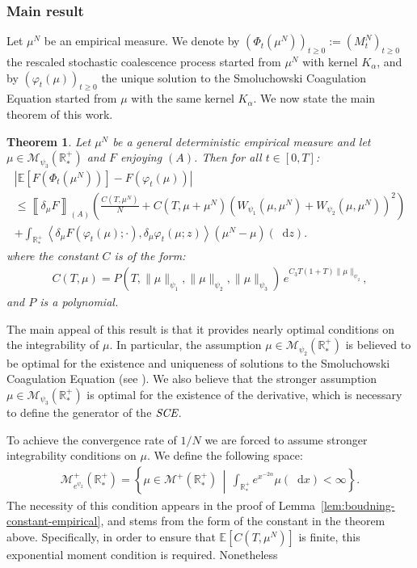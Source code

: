 \documentclass[11pt,a4paper]{article}
\newcommand{\RRP}{\mathbb{R}^+_*}
\newcommand{\MC}{\mathcal{M}}
\newcommand{\SCE}{\emph{SCE}}
\newcommand{\A}{(A)}
\newcommand{\Proc}[1]{\left(#1\right)_{t\geq 0}}
\newcommand{\dd}{\mathop{}\!\mathrm{d}}
\newtheorem{theorem}{Theorem}[section]
\begin{document}
\subsubsection*{Main result}

Let $\mu^N$ be an empirical measure. We denote by \(\Proc{\Phi_t(\mu^N)} := \Proc{M^N_t}\) the rescaled stochastic coalescence process started from \(\mu^N\) with kernel \(K_\alpha\), and by \(\Proc{\varphi_t(\mu)}\) the unique solution to the Smoluchowski Coagulation Equation started from \(\mu\) with the same kernel \(K_\alpha\). We now state the main theorem of this work.

\begin{theorem}\label{thm:main-result}
    Let $\mu^N$ be a general \emph{deterministic} empirical measure and let $\mu \in \MC_{\psi_3}(\RRP)$ and $F$ enjoying $\A$. Then for all $t \in [0,T]$:
    \begin{multline*}
        \left| \mathbb{E}\left[F\left(\Phi_t\left(\mu^N\right)\right)\right] - F\left(\varphi_t(\mu)\right) \right| \\
        \leq \left\llbracket \delta_\mu F \right\rrbracket_{\A} \left( \frac{C(T,\mu^N)}{N} + C(T,\mu + \mu^N)\left(W_{\psi_1}\left(\mu,\mu^N\right) + W_{\psi_2}\left(\mu,\mu^N\right) \right)^2\right) \\
        + \int_{\RRP} \left\langle \delta_\mu F\left(\varphi_t \left(\mu\right);\cdot \right), \delta_\mu \varphi_t\left(\mu;z \right) \right\rangle \left(\mu^N - \mu\right)(\dd z).
    \end{multline*}
    where the constant $C$ is of the form:
    \begin{align*}
        C(T,\mu) = P(T,\|\mu\|_{\psi_1},\|\mu\|_{\psi_2},\|\mu\|_{\psi_3})\, e^{C_3 T(1 + T)\|\mu\|_{\psi_2}},
    \end{align*}
    and $P$ is a polynomial.
\end{theorem}

The main appeal of this result is that it provides nearly optimal conditions on the integrability of $\mu$. In particular, the assumption $\mu \in \MC_{\psi_2}(\RRP)$ is believed to be optimal for the existence and uniqueness of solutions to the Smoluchowski Coagulation Equation (see \cite{norrisSmoluchowskisCoagulationEquation1999}). We also believe that the stronger assumption $\mu \in \MC_{\psi_3}(\RRP)$ is optimal for the existence of the derivative, which is necessary to define the generator of the $\SCE$.

To achieve the convergence rate of $1/N$ we are forced to assume stronger integrability conditions on $\mu$. We define the following space:
\begin{align*}
    \MC^+_{e^{\psi_2}}(\RRP) = \left\lbrace \mu \in \MC^+(\RRP) \,\middle|\, \int_{\RRP} e^{x^{-2\alpha}} \mu(\dd x) < \infty \right\rbrace.
\end{align*}
The necessity of this condition appears in the proof of Lemma~\ref{lem:boudning-constant-empirical}, and stems from the form of the constant in the theorem above. Specifically, in order to ensure that $\mathbb{E}[C(T,\mu^N)]$ is finite, this exponential moment condition is required. Nonetheless 
\end{document}
